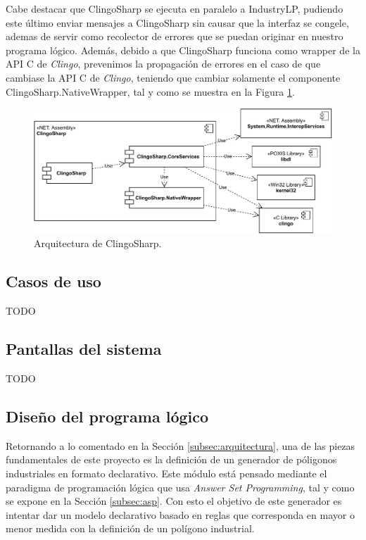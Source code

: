 Cabe destacar que ClingoSharp se ejecuta en paralelo a IndustryLP, pudiendo este último enviar mensajes a ClingoSharp sin causar que la interfaz se congele, ademas de servir como recolector de errores que se puedan originar en nuestro programa lógico. Además, debido a que ClingoSharp funciona como wrapper de la API C de \textit{Clingo}, prevenimos la propagación de errores en el caso de que cambiase la API C de \textit{Clingo}, teniendo que cambiar solamente el componente ClingoSharp.NativeWrapper, tal y como se muestra en la Figura \ref{fig:clingosharp}. \\

\begin{figure}[!h]
	\centering
	\includegraphics[width=\textwidth]{images/clingosharp.pdf}
	\caption{Arquitectura de ClingoSharp.}
	\label{fig:clingosharp}
\end{figure}\textbf{}

\subsection{Casos de uso}
\label{subsec:cases}

TODO

\subsection{Pantallas del sistema}
\label{subsec:mockups}

TODO

\subsection{Diseño del programa lógico}
\label{subsubsec:generator}

Retornando a lo comentado en la Sección \ref{subsec:arquitectura}, una de las piezas fundamentales de este proyecto es la definición de un generador de póligonos industriales en formato declarativo. Este módulo está pensado mediante el paradigma de programación lógica que usa \textit{Answer Set Programming}, tal y como se expone en la Sección \ref{subsec:asp}. Con esto el objetivo de este generador es intentar dar un modelo declarativo basado en reglas que corresponda en mayor o menor medida con la definición de un polígono industrial. \\

